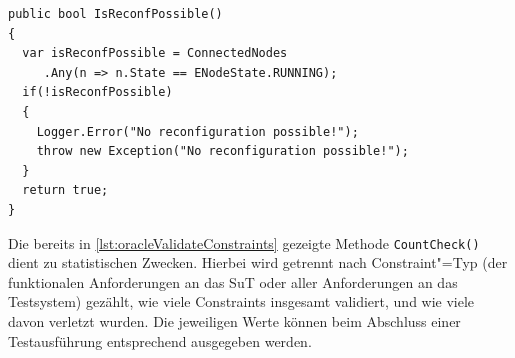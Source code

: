 \begin{lstlisting}[label=lst:oracleIsReconfPossible,style=cs,
caption={Prüfung nach der Möglichkeit weiterer Rekonfigurationen}]
public bool IsReconfPossible()
{
  var isReconfPossible = ConnectedNodes
     .Any(n => n.State == ENodeState.RUNNING);
  if(!isReconfPossible)
  {
    Logger.Error("No reconfiguration possible!");
    throw new Exception("No reconfiguration possible!");
  }
  return true;
}
\end{lstlisting}

Die bereits in \cref{lst:oracleValidateConstraints} gezeigte Methode \texttt{CountCheck()} dient zu statistischen Zwecken.
Hierbei wird getrennt nach Constraint"=Typ (der funktionalen Anforderungen an das \gls{SuT} oder aller Anforderungen an das Testsystem) gezählt, wie viele Constraints insgesamt validiert, und wie viele davon verletzt wurden.
Die jeweiligen Werte können beim Abschluss einer Testausführung entsprechend ausgegeben werden.
